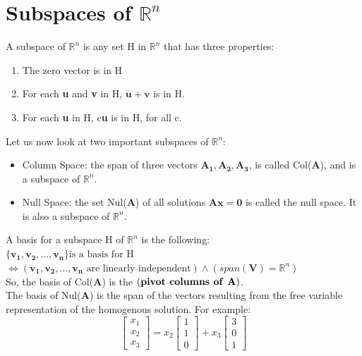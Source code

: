 \documentclass[nobib]{tufte-handout}
\begin{document}
\section{Subspaces of $\mathbb{R}^n$}
A subspace of $\mathbb{R}^n$ is any set H in $\mathbb{R}^n$ that has three properties:
\begin{enumerate}
    \item The zero vector is in H
    \item For each \textbf{u} and \textbf{v} in H, $\mathbf{u+v}$ is in H.
    \item For each \textbf{u} in H, c\textbf{u} is in H, for all c.
\end{enumerate}
Let us now look at two important subspaces of $\mathbb{R}^n$:
\begin{itemize}
    \item Column Space: the span of three vectors $\mathbf{A_1,A_2,A_3}$, is called
          Col(\textbf{A}), and is a subspace of $\mathbb{R}^n$.
    \item Null Space: the set Nul(\textbf{A}) of all solutions $\mathbf{Ax=0}$ is called
          the null space. It is also a subspace of $\mathbb{R}^n$.
\end{itemize}
A basis for a subspace H of $\mathbb{R}^n$ is the following:\\
$\{\mathbf{v_1,v_2,\ldots,v_n}\} \text{is a basis for H}$ \\ $\iff (\mathbf{v_1,v_2,\ldots,v_n} \text{ are linearly independent}) \land (span(\mathbf{V}) = \mathbb{R}^n)$\\
So, the basis of Col(\textbf{A}) is  the $(\textbf{pivot columns of \textbf{A}})$.\\
The basis of Nul(\textbf{A}) is the span of the vectors resulting from the free variable representation of the homogenous solution. For example:\\
\begin{equation*}
    \begin{bmatrix}
        x_1 \\
        x_2 \\
        x_3
    \end{bmatrix} = x_2
    \begin{bmatrix}
        1 \\
        1 \\
        0
    \end{bmatrix}+ x_3
    \begin{bmatrix}
        3 \\
        0 \\
        1
    \end{bmatrix}
\end{equation*}
\end{document}
